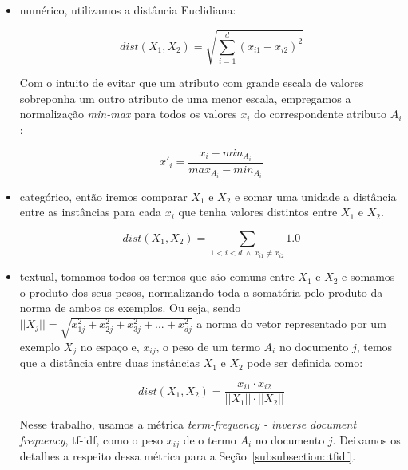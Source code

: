 \begin{itemize}

\item numérico, utilizamos a distância Euclidiana:

\begin{equation}\label{eqn::distancia_euclidiana}
    dist(X_1, X_2) =  \sqrt{\sum_{i=1}^d (x_{i1}-x_{i2})^2}
\end{equation}

    Com o intuito de evitar que um atributo com grande escala de valores sobreponha um outro atributo de uma menor escala, empregamos a normalização \textit{min-max} para todos os valores $x_i$ do correspondente atributo $A_i$: 

\begin{equation}\label{eqn::distancia_euclidiana}
    x'_{i} =  \frac{x_{i} - min_{A_i}}{ max_{A_i} - min_{A_i} }
\end{equation}

\item categórico, então iremos comparar $X_1$ e $X_2$ e somar uma unidade a distância entre as instâncias para cada $x_i$ que tenha valores distintos entre $X_1$ e $X_2$.

\begin{equation}\label{eqn::distancia_cat}
   dist(X_1, X_2) = \sum_{1 < i < d \ \wedge \ x_{i1} \neq x_{i2}} 1.0
\end{equation}

\item textual, tomamos todos os termos que são comuns entre $X_1$ e $X_2$ e somamos o produto dos seus pesos, normalizando toda a somatória pelo produto da norma de ambos os exemplos. Ou seja, sendo $||X_j|| = \sqrt{x_{1j}^2 + x_{2j}^2 + x_{3j}^2 + ... + x_{dj}^2}$ a norma do vetor representado por um exemplo $X_j$ no espaço e, $x_{ij}$, o peso de um termo $A_i$ no documento $j$, temos que a distância entre duas instâncias $X_1$ e $X_2$ pode ser definida como:

\begin{equation}\label{eqn::distancia_texto}
    dist(X_1, X_2) = \frac{  x_{i1} \cdot x_{i2} }{ ||X_1|| \cdot ||X_2|| }
\end{equation}

Nesse trabalho, usamos a métrica \textit{term-frequency - inverse document frequency}, tf-idf, como o peso $x_{ij}$ de o termo $A_i$ no documento $j$. Deixamos os detalhes a respeito dessa métrica para a Seção~\ref{subsubsection::tfidf}.

\end{itemize}

